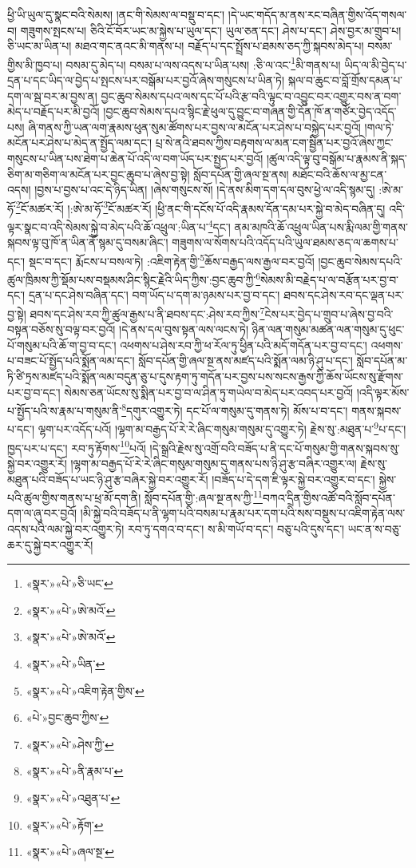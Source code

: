 ཕྱི་ཡི་ཡུལ་དུ་སྣང་བའི་སེམས། །ནང་གི་སེམས་ལ་བསྡུ་བ་དང་། །དེ་ཡང་གདོད་མ་ནས་རང་བཞིན་གྱིས་འོད་གསལ་བ། གཟུགས་སྤངས་པ། ཅིའི་ངོ་བོར་ཡང་མ་སྐྱེས་པ་ཡུལ་དང་། ཡུལ་ཅན་དང་། ཤེས་པ་དང་། ཤེས་བྱར་མ་གྲུབ་པ། ཅི་ཡང་མ་ཡིན་པ། མཐའ་གང་ནའང་མི་གནས་པ། བརྗོད་པ་དང་སྤྲོས་པ་ཐམས་ཅད་ཀྱི་སྐབས་མེད་པ། བསམ་གྱིས་མི་ཁྱབ་པ། བསམ་དུ་མེད་པ། བསམ་པ་ལས་འདས་པ་ཡིན་པས། :ཅི་ལ་འང་\footnote{«སྣར་»«པེ་»ཅི་ཡང་}མི་གནས་པ། ཡིད་ལ་མི་བྱེད་པ་དྲན་པ་དང་ཡིད་ལ་བྱེད་པ་སྤངས་པར་བསྒོམ་པར་བྱའོ་ཞེས་གསུངས་པ་ཡིན་ཏེ། སྐལ་བ་ཆུང་བ་བློ་གྲོས་དམན་པ་དག་ལ་སྦ་བར་མ་བྱས་ན། བྱང་ཆུབ་སེམས་དཔའ་ལས་དང་པོ་པའི་རྩ་བའི་ལྟུང་བ་འབྱུང་བར་འགྱུར་བས་ན་བག་མེད་པ་བརྗོད་པར་མི་བྱའོ། །བྱང་ཆུབ་སེམས་དཔའ་སྙིང་རྗེ་ཕུལ་དུ་བྱུང་བ་གཞན་གྱི་དོན་ཁོ་ན་གཙོར་བྱེད་འདོད་པས། ཞི་གནས་ཀྱི་ཡན་ལག་རྣམས་ཕུན་སུམ་ཚོགས་པར་བྱས་ལ་མངོན་པར་ཤེས་པ་བསྐྱེད་པར་བྱའོ། །གལ་ཏེ་མངོན་པར་ཤེས་པ་མེད་ན་སྤྱོད་ལམ་དང་། པྲ་སེ་ནའི་ཐབས་ཀྱིས་བརྟགས་ལ་མན་ངག་སྦྱིན་པར་བྱའོ་ཞེས་ཀྱང་གསུངས་པ་ཡིན་པས་ཐེག་པ་ཆེན་པོ་འདི་ལ་བག་ཡོད་པར་སྤྱད་པར་བྱའོ། །ཚུལ་འདི་ལྟ་བུ་བསྒོམ་པ་རྣམས་ནི་སྐད་ཅིག་མ་གཅིག་ལ་མངོན་པར་བྱང་ཆུབ་པ་ཞེས་བྱ་སྟེ། སློབ་དཔོན་གྱི་ཞལ་སྔ་ནས། མཐོང་བའི་ཆོས་ལ་མྱ་ངན་འདས། །བྱས་པ་བྱས་པ་འང་དེ་ཉིད་ཡིན། །ཞེས་གསུངས་སོ། །དེ་ནས་མིག་དག་དལ་བུས་ཕྱེ་ལ་འདི་སྙམ་དུ། :ཨེ་མ་ཧོ་\footnote{«སྣར་»«པེ་»ཨེ་མའོ་}ངོ་མཚར་རོ། །:ཨེ་མ་ཧོ་\footnote{«སྣར་»«པེ་»ཨེ་མའོ་}ངོ་མཚར་རོ། །ཕྱི་ནང་གི་དངོས་པོ་འདི་རྣམས་དོན་དམ་པར་སྐྱེ་བ་མེད་བཞིན་དུ། འདི་ལྟར་སྣང་བ་འདི་སེམས་སྐྱེ་བ་མེད་པའི་ཆོ་འཕྲུལ་:ཡིན་པ་\footnote{«སྣར་»«པེ་»ཡིན་}དང་། ནམ་མཁའི་ཆོ་འཕྲུལ་ཡིན་པས་རྨི་ལམ་གྱི་གནས་སྐབས་ལྟ་བུ་ཁོ་ན་ཡིན་ནོ་སྙམ་དུ་བསམ་ཞིང་། གཟུགས་ལ་སོགས་པའི་འདོད་པའི་ཡུལ་ཐམས་ཅད་ལ་ཆགས་པ་དང་། སྡང་བ་དང་། རྨོངས་པ་བསལ་ཏེ། :འཇིག་རྟེན་གྱི་\footnote{«སྣར་»«པེ་»འཇིག་རྟེན་གྱིས་}ཆོས་བརྒྱད་ལས་རྒྱལ་བར་བྱའོ། །བྱང་ཆུབ་སེམས་དཔའི་ཚུལ་ཁྲིམས་ཀྱི་སྡོམ་པས་བསྡམས་ཤིང་སྙིང་རྗེའི་ཡིད་ཀྱིས་:བྱང་ཆུབ་ཀྱི་\footnote{«པེ་»བྱང་ཆུབ་ཀྱིས་}སེམས་མི་བརྗེད་པ་ལ་བརྩོན་པར་བྱ་བ་དང་། དྲན་པ་དང་ཤེས་བཞིན་དང་། བག་ཡོད་པ་དག་མ་ཉམས་པར་བྱ་བ་དང་། ཐབས་དང་ཤེས་རབ་དང་ལྡན་པར་བྱ་སྟེ། ཐབས་དང་ཤེས་རབ་ཀྱི་ཚུལ་རྒྱས་པ་ནི་ཐབས་དང་:ཤེས་རབ་ཀྱིས་\footnote{«སྣར་»«པེ་»ཤེས་ཀྱི་}ངེས་པར་བྱེད་པ་གྲུབ་པ་ཞེས་བྱ་བའི་བསྟན་བཅོས་སུ་བལྟ་བར་བྱའོ། །དེ་ནས་དལ་བུས་སྟན་ལས་ལངས་ཏེ། ཉིན་ལན་གསུམ་མཚན་ལན་གསུམ་དུ་ཕུང་པོ་གསུམ་པའི་ཆོ་ག་བྱ་བ་དང་། འཕགས་པ་ཤེས་རབ་ཀྱི་ཕ་རོལ་ཏུ་ཕྱིན་པའི་མདོ་གདོན་པར་བྱ་བ་དང་། འཕགས་པ་བཟང་པོ་སྤྱོད་པའི་སྨོན་ལམ་དང་། སློབ་དཔོན་གྱི་ཞལ་སྔ་ནས་མཛད་པའི་སྨོན་ལམ་ཉི་ཤུ་པ་དང་། སློབ་དཔོན་མ་ཏི་ཙི་ཏྲས་མཛད་པའི་སྨོན་ལམ་བདུན་ཅུ་པ་དུས་རྟག་ཏུ་གདོན་པར་བྱས་པས་སངས་རྒྱས་ཀྱི་ཆོས་ཡོངས་སུ་རྫོགས་པར་བྱ་བ་དང་། སེམས་ཅན་ཡོངས་སུ་སྨིན་པར་བྱ་བ་ལ་ཤིན་ཏུ་གཡེལ་བ་མེད་པར་འབད་པར་བྱའོ། །འདི་ལྟར་མོས་པ་སྤྱོད་པའི་ས་རྣམ་པ་གསུམ་ནི་\footnote{«སྣར་»«པེ་»ནི་རྣམ་པ་}དགུར་འགྱུར་ཏེ། དང་པོ་ལ་གསུམ་དུ་གནས་ཏེ། མོས་པ་བ་དང་། གནས་སྐབས་པ་དང་། ལྷག་པར་འདོད་པའོ། །ལྷག་མ་བརྒྱད་པོ་རེ་རེ་ཞིང་གསུམ་གསུམ་དུ་འགྱུར་ཏེ། རྗེས་སུ་:མཐུན་པ་\footnote{«སྣར་»«པེ་»འཐུན་པ་}པ་དང་། ཁྱད་པར་པ་དང་། རབ་ཏུ་རྟོགས་\footnote{«སྣར་»«པེ་»རྟོག་}པའོ། །དེ་སྒྲའི་རྗེས་སུ་འགྲོ་བའི་བཟོད་པ་ནི་དང་པོ་གསུམ་གྱི་གནས་སྐབས་སུ་སྐྱེ་བར་འགྱུར་རོ། །ལྷག་མ་བརྒྱད་པོ་རེ་རེ་ཞིང་གསུམ་གསུམ་དུ་གནས་པས་ཉི་ཤུ་རྩ་བཞིར་འགྱུར་ལ། རྗེས་སུ་མཐུན་པའི་བཟོད་པ་ཡང་ཉི་ཤུ་རྩ་བཞིར་སྐྱེ་བར་འགྱུར་རོ། །བཟོད་པ་དེ་དག་ཇི་ལྟར་སྐྱེ་བར་འགྱུར་བ་དང་། སྐྱེས་པའི་ཚུལ་གྱིས་གནས་པ་ཕྲ་མོ་དག་ནི། སློབ་དཔོན་གྱི་:ཞལ་སྔ་ནས་ཀྱི་\footnote{«སྣར་»«པེ་»ཞལ་སྔ་}བཀའ་དྲིན་གྱིས་འཚོ་བའི་སློབ་དཔོན་དག་ལ་ཞུ་བར་བྱའོ། །མི་སྐྱེ་བའི་བཟོད་པ་ནི་ལྷག་པའི་བསམ་པ་རྣམ་པར་དག་པའི་སས་བསྡུས་པ་འཇིག་རྟེན་ལས་འདས་པའི་ལམ་སྐྱེ་བར་འགྱུར་ཏེ། རབ་ཏུ་དགའ་བ་དང་། ས་མི་གཡོ་བ་དང་། བཅུ་པའི་དུས་དང་། ཡང་ན་ས་བཅུ་ཆར་དུ་སྐྱེ་བར་འགྱུར་རོ། 